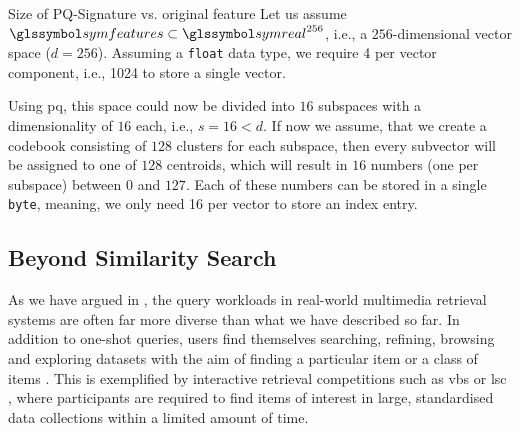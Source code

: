 \begin{example}[label=example:pq_compression]{Size of PQ-Signature vs. original feature}{}
    Let us assume $\symfeatures \subset \symreal^{256}$, i.e., a $256$-dimensional vector space ($d = 256$). Assuming a \texttt{float} data type, we require \SI{4}{\byte} per vector component, i.e., \SI{1024}{\byte} to store a single vector.
    
    Using \acrshort{pq}, this space could now be divided into $16$ subspaces with a dimensionality of $16$ each, i.e., $s = 16 < d$. If now we assume, that we create a codebook consisting of $128$ clusters for each subspace, then every subvector will be assigned to one of $128$ centroids, which will result in $16$ numbers (one per subspace) between $0$ and $127$. Each of these numbers can be stored in a single \texttt{byte}, meaning, we only need \SI{16}{\byte} per vector to store an index entry.
\end{example}

\subsection{Beyond Similarity Search}
As we have argued in , the query workloads in real-world multimedia retrieval systems are often far more diverse than what we have described so far. In addition to one-shot queries, users find themselves searching, refining, browsing and exploring datasets with the aim of finding a particular item or a class of items \cite{Lokovc:2019Interactive,Rossetto:2020Interactive}. This is exemplified by interactive retrieval competitions such as \acrshort{vbs} \cite{Schoeffmann:2019Video,Lokovc:2018Influential} or \acrshort{lsc} \cite{Gurrin:2021Introduction}, where participants are required to find items of interest in large, standardised data collections \cite{Berns:2019V3C1,Rossetto:2021Insights} within a limited amount of time.

